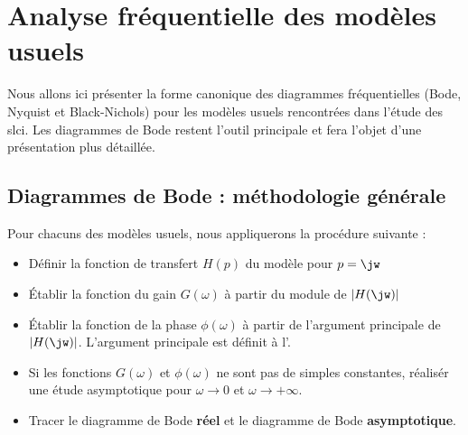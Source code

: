 \newpage
\section{Analyse fréquentielle des modèles usuels}


Nous allons ici présenter la forme canonique des diagrammes fréquentielles 
(Bode, Nyquist et Black-Nichols) pour les modèles usuels rencontrées dans 
l'étude des \gls{slci}. Les diagrammes de Bode restent l'outil principale et 
fera l'objet d'une présentation plus détaillée.
\subsection{Diagrammes de Bode : méthodologie générale}
Pour chacuns des modèles usuels, nous appliquerons la procédure suivante :
\begin{itemize}
    \item Définir la fonction de transfert $H(p)$ du modèle pour $p=\jw$
    \item \'Etablir la fonction du gain $G(\omega)$ à partir du 
          module de $|H(\jw)|$
    \item \'Etablir la fonction de la phase $\phi(\omega)$ à partir de 
          l'argument principale de $|H(\jw)|$.
          L'argument principale est définit à l'.
    \item Si les fonctions $G(\omega)$ et $\phi(\omega)$ ne sont pas de 
          simples constantes, réalisér une étude
          asymptotique pour $\omega\rightarrow 0$ et 
          $\omega\rightarrow +\infty$.
    \item Tracer le diagramme de Bode \textbf{réel} et le diagramme 
          de Bode \textbf{asymptotique}.
\end{itemize}

